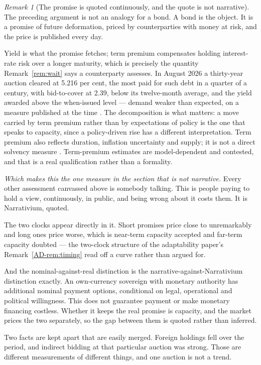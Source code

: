 \documentclass[11pt,a4paper]{article}
\theoremstyle{remark}
\newtheorem{remark}[definition]{Remark}
\begin{document}
\begin{remark}[The promise is quoted continuously, and the quote is not narrative]\label{rem:bonds}
The preceding argument is not an analogy for a bond. A bond is the object. It is a promise of
future deformation, priced by counterparties with money at risk, and the price is published every day.

Yield is what the promise fetches; term premium compensates holding interest-rate risk over a longer maturity,
which is precisely the quantity Remark~\ref{rem:wait} says a counterparty assesses. In August 2026 a
thirty-year auction cleared at 5.216 per cent, the most paid for such debt in a quarter of a century,
with bid-to-cover at 2.39, below its twelve-month average, and the yield awarded above the when-issued level --- demand weaker than expected, on a
measure published at the time \citep{bonds2026,bonds2026b}. The decomposition is what matters: a move
carried by term premium rather than by expectations of policy is the one that speaks to capacity, since
a policy-driven rise has a different interpretation. Term premium also reflects duration, inflation uncertainty and supply; it is not a direct solvency measure \citep{nyfedterm}. Term-premium estimates are model-dependent and
contested, and that is a real qualification rather than a formality.

\emph{Which makes this the one measure in the section that is not narrative.} Every other assessment
canvassed above is somebody talking. This is people paying to hold a view, continuously, in
public, and being wrong about it costs them. It is Narrativium, quoted.

The two clocks appear directly in it. Short promises price close to unremarkably and long ones
price worse, which is near-term capacity accepted and far-term capacity doubted --- the two-clock structure of the adaptability paper's Remark~\ref{AD-rem:timing} read off a curve rather than argued for.

And the nominal-against-real distinction is the narrative-against-Narrativium distinction exactly.
An own-currency sovereign with monetary authority has additional nominal payment options, conditional on legal, operational and political willingness. This does not guarantee payment or make monetary financing costless. Whether it keeps the real promise is
capacity, and the market prices the two separately, so the gap between them is quoted rather than
inferred.

Two facts are kept apart that are easily merged. Foreign holdings fell over the period, and
indirect bidding at that particular auction was strong. Those are different measurements of different
things, and one auction is not a trend.
\end{remark}
\end{document}
